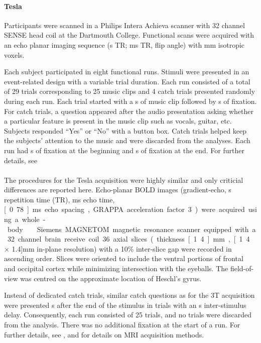 \paragraph{\unit[3]{Tesla}}
%
Participants were scanned in a Philips Intera Achieva scanner with 32 channel
SENSE head coil at the Dartmouth College. Functional scans were acquired with
an echo planar imaging sequence (\unit[2]{s} TR; \unit[35]{ms} TR,
\unit[90]{\textdegree} flip angle) with \unit[3]{mm} isotropic voxels.

Each subject participated in eight functional runs. Stimuli were presented in
an event-related design with a variable trial duration. Each run consisted of a
total of 29 trials corresponding to 25 music clips and 4 catch trials presented
randomly during each run. Each trial started with a \unit[6]{s} of music clip
followed by \unit[4-8]{s} of fixation. For catch trials, a question appeared
after the audio presentation asking whether a particular feature is present in
the music clip such as vocals, guitar, etc. Subjects responded “Yes” or “No”
with a button box. Catch trials helped keep the subjects’ attention to the
music and were discarded from the analyses. Each run had \unit[4]{s} of
fixation at the beginning and \unit[10]{s} of fixation at the end. For further
details, see \citet{CTK+2012}

\paragraph{\sevenT}
%
The procedures for the \unit[7]{Tesla} acquisition were highly similar and only
criticial differences are reported here. Echo-planar BOLD images
(gradient-echo, \unit[2]{s} repetition time (TR), \unit[22]{ms} echo time,
\unit[0.78]{ms} echo spacing, GRAPPA acceleration factor 3) were acquired using
a whole-body \sevenT\ Siemens MAGNETOM magnetic resonance scanner equipped with
a 32 channel brain receive coil. 36 axial slices (thickness \unit[1.4]{mm},
\unit[1.4 $\times$ 1.4]{mm} in-plane resolution) with a 10\% inter-slice gap
were recorded in ascending order.  Slices were oriented to include the ventral
portions of frontal and occipital cortex while minimizing intersection with the
eyeballs. The field-of-view was centred on the approximate location of Heschl's
gyrus.

Instead of dedicated catch trials, similar catch questions as for the 3T
acquisition were presented \unit[4]{s} after the end of the stimulus in
trials with an \unit[8]{s} inter-stimulus delay. Consequently, each run
consisted of 25 trials, and no trials were discarded from the analysis.  There
was no additional fixation at the start of a run. For further details, see
\citet{HDH+2015}, and \citet{HBI+14} for details on MRI acquisition methods.


